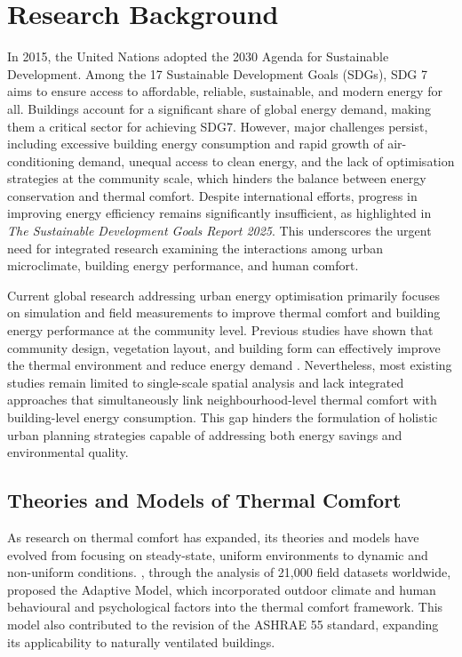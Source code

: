 \section{Research Background}

In 2015, the United Nations adopted the 2030 Agenda for Sustainable Development. Among the 17 Sustainable Development Goals (SDGs), SDG 7 aims to ensure access to affordable, reliable, sustainable, and modern energy for all. Buildings account for a significant share of global energy demand, making them a critical sector for achieving SDG7. However, major challenges persist, including excessive building energy consumption and rapid growth of air-conditioning demand, unequal access to clean energy, and the lack of optimisation strategies at the community scale, which hinders the balance between energy conservation and thermal comfort. Despite international efforts, progress in improving energy efficiency remains significantly insufficient, as highlighted in \textit{The Sustainable Development Goals Report 2025}. This underscores the urgent need for integrated research examining the interactions among urban microclimate, building energy performance, and human comfort.

Current global research addressing urban energy optimisation primarily focuses on simulation and field measurements to improve thermal comfort and building energy performance at the community level. Previous studies have shown that community design, vegetation layout, and building form can effectively improve the thermal environment and reduce energy demand \citep{oke1981canyon,wang2025impact,zheng2025reanalysis}. Nevertheless, most existing studies remain limited to single-scale spatial analysis and lack integrated approaches that simultaneously link neighbourhood-level thermal comfort with building-level energy consumption. This gap hinders the formulation of holistic urban planning strategies capable of addressing both energy savings and environmental quality.

\subsection{Theories and Models of Thermal Comfort}

As research on thermal comfort has expanded, its theories and models have evolved from focusing on steady-state, uniform environments to dynamic and non-uniform conditions. \citet{deDear2002thermal}, through the analysis of 21,000 field datasets worldwide, proposed the Adaptive Model, which incorporated outdoor climate and human behavioural and psychological factors into the thermal comfort framework. This model also contributed to the revision of the ASHRAE 55 standard, expanding its applicability to naturally ventilated buildings.

